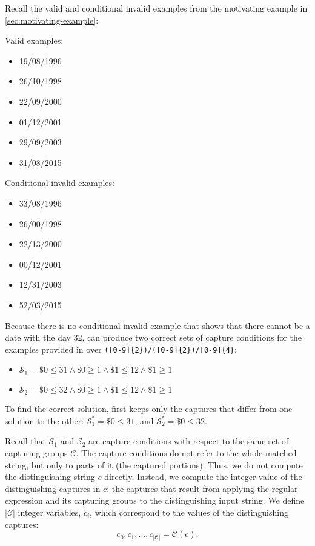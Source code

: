 \begin{example}\label{ex:cond_cap_keep_distinct}
Recall the valid and conditional invalid examples from the motivating example in \autoref{sec:motivating-example}:

\noindent
Valid examples:
\begin{multicols}{3}
    \begin{itemize}[label={}]
    \item 19/08/1996
    \item 26/10/1998
    \item 22/09/2000
    \item 01/12/2001
    \item 29/09/2003
    \item 31/08/2015
    \end{itemize}
\end{multicols}

\noindent
Conditional invalid examples: 
\begin{multicols}{3}
    \begin{itemize}[label={}]
    \item 33/08/1996
    \item 26/00/1998
    \item 22/13/2000
    \item 00/12/2001
    \item 12/31/2003
    \item 52/03/2015
    \end{itemize}
\end{multicols}
Because there is no conditional invalid example that shows that there cannot be a date with the day 32, \Forest can produce two correct sets of capture conditions for the examples provided in  over \verb`([0-9]{2})/([0-9]{2})/[0-9]{4}`:
\begin{itemize}
    \item \(\mathcal{S}_1 = \$0 \le 31 \wedge \$0 \ge 1 \wedge \$1 \le 12 \wedge \$1 \ge 1\)
    \item \(\mathcal{S}_2 = \$0 \le 32 \wedge \$0 \ge 1 \wedge \$1 \le 12 \wedge \$1 \ge 1\)
\end{itemize}
To find the correct solution, \Forest first keeps only the captures that differ from one solution to the other: \(\mathcal{S}_1^* = \$0 \le 31\), and \(\mathcal{S}_2^* = \$0 \le 32\).
\end{example}

Recall that \(\mathcal{S}_1\) and \(\mathcal{S}_2\) are capture conditions with respect to the same set of capturing groups \(\mathcal{C}\). The capture conditions do not refer to the whole matched string, but only to parts of it (the captured portions). Thus, we do not compute the distinguishing string \(c\) directly. Instead, we compute the integer value of the distinguishing captures in \(c\): the captures that result from applying the regular expression and its capturing groups to the distinguishing input string.
%
We define \(|\mathcal{C}|\) integer variables, \(c_i\), which correspond to the values of the distinguishing captures:
%
\[c_0, c_1, ..., c_{|\mathcal{C}|} = \mathcal{C}(c).\]


